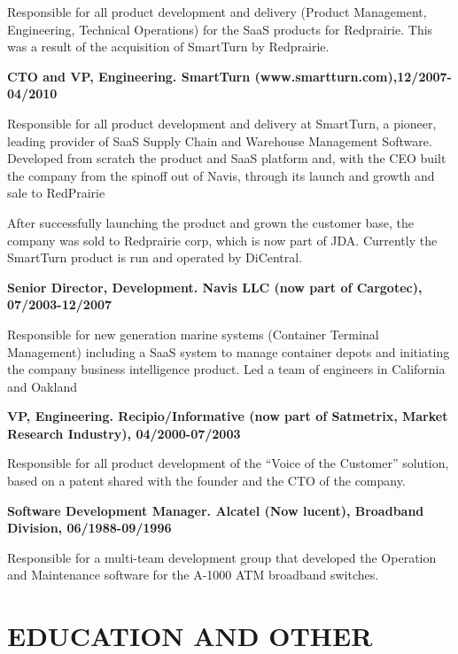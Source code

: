 \documentclass{res}
\begin{document}
\begin{resume}
Responsible for all product development and delivery (Product Management, Engineering, Technical Operations) for the SaaS products for Redprairie. This was a result of the acquisition of SmartTurn by Redprairie.


{\bf CTO and VP, Engineering. SmartTurn (www.smartturn.com),12/2007-04/2010}
    
Responsible for all product development and delivery at SmartTurn, a pioneer, leading provider of SaaS Supply Chain and Warehouse Management Software. Developed from scratch the product and SaaS platform and, with the CEO built the company from the spinoff out of Navis, through its launch and growth and sale to RedPrairie

After successfully launching the product and grown the customer base, the company was sold to Redprairie corp, which is now part of JDA. Currently the SmartTurn product is run and operated by DiCentral.

{\bf Senior Director, Development. Navis LLC (now part of Cargotec), 07/2003-12/2007}

Responsible for new generation marine systems (Container Terminal Management) including a SaaS system to manage container depots and initiating the company business intelligence product. Led a team of engineers in California and Oakland

{\bf VP, Engineering. Recipio/Informative (now part of Satmetrix, Market Research Industry), 04/2000-07/2003}

    Responsible for all product development of the “Voice of the Customer” solution, based on a patent shared with the founder and the CTO of the company. 


{\bf Software Development Manager. Alcatel (Now lucent), Broadband Division, 06/1988-09/1996}

Responsible for a multi-team development group that developed the Operation and Maintenance software for the A-1000 ATM broadband switches.

\section{EDUCATION AND OTHER}

    

\end{resume}
\end{document}
